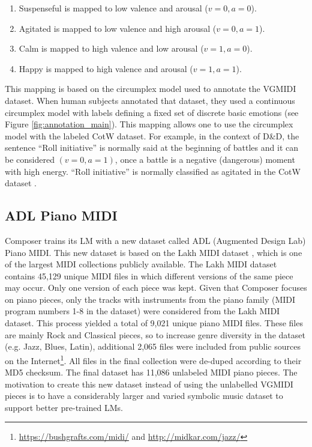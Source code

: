 \begin{enumerate}
    \item Suspenseful is mapped to low valence and arousal ($v = 0, a = 0$).
    \item Agitated is mapped to low valence and high arousal ($v = 0, a = 1$).
    \item Calm is mapped to high valence and low arousal ($v = 1, a = 0$).
    \item Happy is mapped to high valence and arousal ($v = 1, a = 1$).
\end{enumerate}

This mapping is based on the circumplex model used to annotate the VGMIDI dataset. When human subjects annotated that dataset, they used a continuous circumplex model with labels defining a fixed set of discrete basic emotions (see Figure \ref{fig:annotation_main}). This mapping allows one to use the circumplex model with the labeled CotW dataset. For example, in the context of D\&D, the sentence ``Roll initiative'' is normally said at the beginning of battles and it can be considered $(v = 0, a = 1)$, once a battle is a negative (dangerous) moment with high energy. ``Roll initiative'' is normally classified as agitated in the CotW dataset \cite{padovani2017}.

\subsection{ADL Piano MIDI}

Composer trains its LM with a new dataset called ADL (Augmented Design Lab) Piano MIDI. This new dataset is based on the Lakh MIDI dataset \cite{raffel2016learning}, which is one of the largest MIDI collections publicly available. The Lakh MIDI dataset contains 45,129 unique MIDI files in which different versions of the same piece may occur. Only one version of each piece was kept. Given that Composer focuses on piano pieces, only the tracks with instruments from the piano family (MIDI program numbers 1-8 in the dataset) were considered from the Lakh MIDI dataset. This process yielded a total of 9,021 unique piano MIDI files. These files are mainly Rock and Classical pieces, so to increase genre diversity in the dataset (e.g. Jazz, Blues, Latin), additional 2,065 files were included from public sources on the Internet\footnote{\url{https://bushgrafts.com/midi/} and \url{http://midkar.com/jazz/}}. All files in the final collection were de-duped according to their MD5 checksum. The final dataset has 11,086 unlabeled MIDI piano pieces. The motivation to create this new dataset instead of using the unlabelled VGMIDI pieces is to have a considerably larger and varied symbolic music dataset to support better pre-trained LMs.

